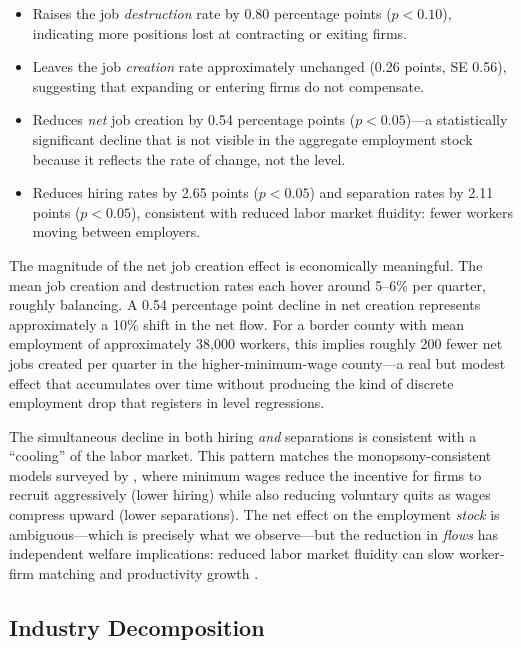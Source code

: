 \documentclass[12pt]{article}
\begin{document}
\begin{itemize}
\item Raises the job \textit{destruction} rate by 0.80 percentage points ($p < 0.10$), indicating more positions lost at contracting or exiting firms.
\item Leaves the job \textit{creation} rate approximately unchanged (0.26 points, SE 0.56), suggesting that expanding or entering firms do not compensate.
\item Reduces \textit{net} job creation by 0.54 percentage points ($p < 0.05$)---a statistically significant decline that is not visible in the aggregate employment stock because it reflects the rate of change, not the level.
\item Reduces hiring rates by 2.65 points ($p < 0.05$) and separation rates by 2.11 points ($p < 0.05$), consistent with reduced labor market fluidity: fewer workers moving between employers.
\end{itemize}

The magnitude of the net job creation effect is economically meaningful. The mean job creation and destruction rates each hover around 5--6\% per quarter, roughly balancing. A 0.54 percentage point decline in net creation represents approximately a 10\% shift in the net flow. For a border county with mean employment of approximately 38,000 workers, this implies roughly 200 fewer net jobs created per quarter in the higher-minimum-wage county---a real but modest effect that accumulates over time without producing the kind of discrete employment drop that registers in level regressions.

The simultaneous decline in both hiring \textit{and} separations is consistent with a ``cooling'' of the labor market. This pattern matches the monopsony-consistent models surveyed by \citet{manning2021elusive}, where minimum wages reduce the incentive for firms to recruit aggressively (lower hiring) while also reducing voluntary quits as wages compress upward (lower separations). The net effect on the employment \textit{stock} is ambiguous---which is precisely what we observe---but the reduction in \textit{flows} has independent welfare implications: reduced labor market fluidity can slow worker-firm matching and productivity growth \citep{davis1996job}.

\subsection{Industry Decomposition}
\end{document}
